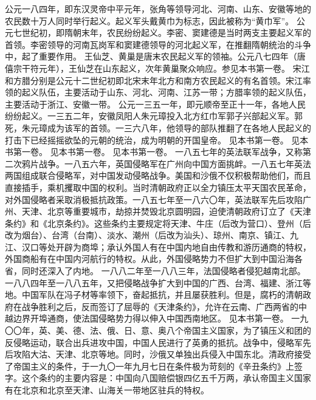 \begin{maonote}
公元一八四年，即东汉灵帝中平元年，张角等领导河北、河南、山东、安徽等地的农民数十万人同时举行起义。起义军头戴黄巾为标志，因此被称为“黄巾军”。
公元七世纪初，即隋朝末年，农民纷纷起义。李密、窦建德是当时两支主要起义军的首领。李密领导的河南瓦岗军和窦建德领导的河北起义军，在推翻隋朝统治的斗争中，起了重要作用。
王仙芝、黄巢是唐末农民起义军的领袖。公元八七四年（唐僖宗干符元年），王仙芝在山东起义，次年黄巢聚众响应。参见本书第一卷。
宋江和方腊分别是公元十二世纪初即北宋末年北方和南方农民起义的有名首领。宋江率领的起义队伍，主要活动于山东、河北、河南、江苏一带；方腊率领的起义队伍，主要活动于浙江、安徽一带。
公元一三五一年，即元顺帝至正十一年，各地人民纷纷起义。一三五二年，安徽凤阳人朱元璋投入北方红巾军郭子兴部起义军。郭死，朱元璋成为该军的首领。一三六八年，他领导的部队推翻了在各地人民起义的打击下已经摇摇欲坠的元朝的统治，成为明朝的开国皇帝。
见本书第一卷。
见本书第一卷。
见本书第一卷。
见本书第一卷。
一八五七年的英法联军战争，又称第二次鸦片战争。一八五六年，英国侵略军在广州向中国方面挑衅。一八五七年英法两国组成联合侵略军，对中国发动侵略战争。美国和沙俄不仅积极帮助他们，而且直接插手，乘机攫取中国的权利。当时清朝政府正以全力镇压太平天国农民革命，对外国侵略者采取消极抵抗政策。一八五七年至一八六〇年，英法联军先后攻陷广州、天津、北京等重要城市，劫掠并焚毁北京圆明园，迫使清朝政府订立了《天津条约》和《北京条约》。这些条约主要规定将天津、牛庄（后改为营口）、登州（后改为烟台）、台湾（台南）、淡水、潮州（后改为汕头）、琼州、南京、镇江、九江、汉口等处开辟为商埠；承认外国人有在中国内地自由传教和游历通商的特权，外国商船有在中国内河航行的特权。从此，外国侵略势力不但扩大到中国沿海各省，同时还深入了内地。
一八八二年至一八八三年，法国侵略者侵犯越南北部。一八八四年至一八八五年，又把侵略战争扩大到中国的广西、台湾、福建、浙江等地。中国军队在冯子材等率领下，奋起抵抗，并且屡获胜利。但是，腐朽的清朝政府在战争胜利之后，反而签订了屈辱的《天津条约》，允许在云南、广西两省的中越边界开埠通商，使法国侵略势力得以伸入中国西南地区。
见本书第一卷。
一九〇〇年，英、美、德、法、俄、日、意、奥八个帝国主义国家，为了镇压义和团的反侵略运动，联合出兵进攻中国，中国人民进行了英勇的抵抗。战争中，侵略军先后攻陷大沽、天津、北京等地。同时，沙俄又单独出兵侵入中国东北。清政府接受了帝国主义的条件，于一九〇一年九月七日在条件极为苛刻的《辛丑条约》上签字。这个条约的主要内容是：中国向八国赔偿银四亿五千万两，承认帝国主义国家有在北京和北京至天津、山海关一带地区驻兵的特权。

\end{maonote}
